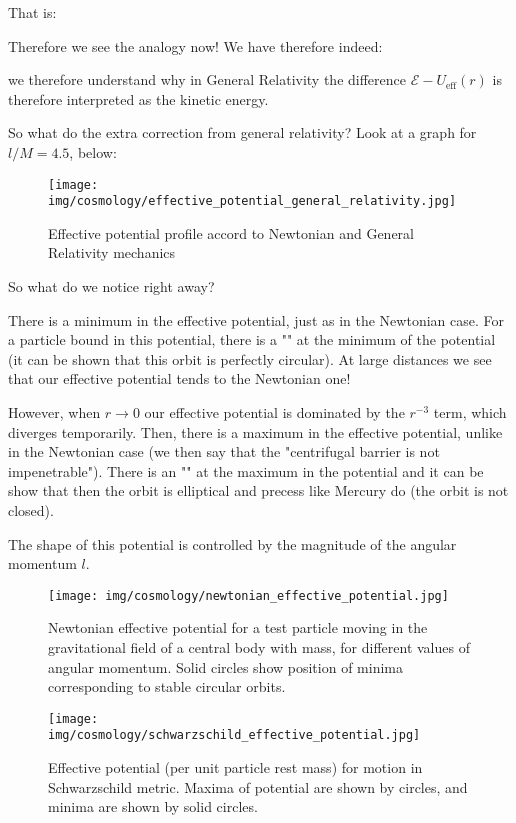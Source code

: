 	That is:
	
	Therefore we see the analogy now! We have therefore indeed:
	
	\begin{tcolorbox}[title=Remark,colframe=black,arc=10pt]
	we therefore understand why in General Relativity the difference $\mathcal{E}-U_\text{eff}(r)$ is therefore interpreted as the kinetic energy.
	\end{tcolorbox}
	So what do the extra correction from general relativity? Look at a graph for $l/M = 4.5$, below:
	\begin{figure}[H]
		\centering
		\texttt{[image: img/cosmology/effective\_potential\_general\_relativity.jpg]}
		\caption{Effective potential profile accord to Newtonian and General Relativity mechanics}
	\end{figure}
	So what do we notice right away?
	
	There is a minimum in the effective potential, just as in the Newtonian case. For a particle bound in this potential, there is a "" at the minimum of the potential (it can be shown that this orbit is perfectly circular). At large distances we see that our effective potential tends to the Newtonian one!
	
	However, when $r\rightarrow 0$ our effective potential is dominated by the $r^{-3}$ term, which diverges temporarily. Then, there is a maximum in the effective potential, unlike in the Newtonian case (we then say that the "centrifugal barrier is not impenetrable"). There is an "" at the maximum in the potential and it can be show that then the orbit is elliptical and precess like Mercury do (the orbit is not closed).
	
	The shape of this potential is controlled by the magnitude of the angular momentum $l$.
	\begin{figure}[H]
		\centering
		\texttt{[image: img/cosmology/newtonian\_effective\_potential.jpg]}
		\captionsetup{width=0.7\linewidth}
		\caption[]{Newtonian effective potential for a test particle moving in the gravitational field of a central body with mass, for different values of angular momentum. Solid circles show position of minima corresponding to stable circular orbits.}
	\end{figure}
	\begin{figure}[H]
		\centering
		\texttt{[image: img/cosmology/schwarzschild\_effective\_potential.jpg]}
		\captionsetup{width=0.7\linewidth}
		\caption[]{Effective potential (per unit particle rest mass) for motion in Schwarzschild metric. Maxima of potential are shown by circles, and minima are shown by solid circles.}
	\end{figure}
	

